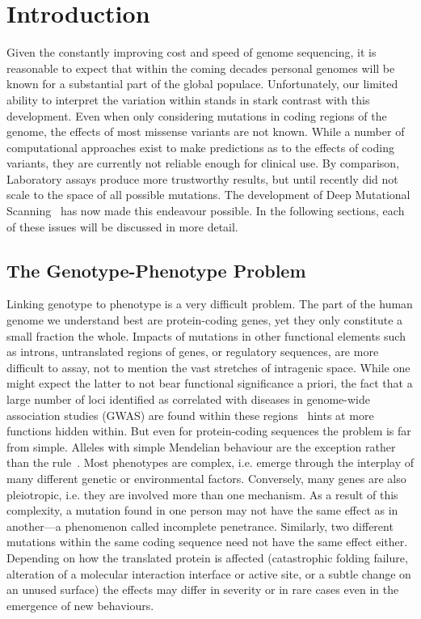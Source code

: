 
\chapter{Introduction}

Given the constantly improving cost and speed of genome sequencing, it is reasonable to expect that within the coming decades personal genomes will be known for a substantial part of the global populace. Unfortunately, our limited ability to interpret the variation within stands in stark contrast with this development. Even when only considering mutations in coding regions of the genome, the effects of most missense variants are not known. While a number of computational approaches exist to make predictions as to the effects of coding variants, they are currently not reliable enough for clinical use. By comparison, Laboratory assays produce more trustworthy results, but until recently did not scale to the space of all possible mutations. The development of Deep Mutational Scanning~\cite{fowler_high-resolution_2010} has now made this endeavour possible. In the following sections, each of these issues will be discussed in more detail.

\section{The Genotype-Phenotype Problem}
\label{introGenoPheno}

Linking genotype to phenotype is a very difficult problem. The part of the human genome we understand best are protein-coding genes, yet they only constitute a small fraction the whole. Impacts of mutations in other functional elements such as introns, untranslated regions of genes, or regulatory sequences, are more difficult to assay, not to mention the vast stretches of intragenic space. While one might expect the latter to not bear functional significance a priori, the fact that a large number of loci identified as correlated with diseases in genome-wide association studies (GWAS) are found within these regions~\cite{edwards_beyond_2013} hints at more functions hidden within. %
But even for protein-coding sequences the problem is far from simple. Alleles with simple Mendelian behaviour are the exception rather than the rule~. Most phenotypes are complex, i.e. emerge through the interplay of many different genetic or environmental factors. Conversely, many genes are also pleiotropic, i.e. they are involved more than one mechanism. As a result of this complexity, a mutation found in one person may not have the same effect as in another---a phenomenon called incomplete penetrance. Similarly, two different mutations within the same coding sequence need not have the same effect either. Depending on how the translated protein is affected (catastrophic folding failure, alteration of a molecular interaction interface or active site, or a subtle change on an unused surface) the effects may differ in severity or in rare cases even in the emergence of new behaviours.


